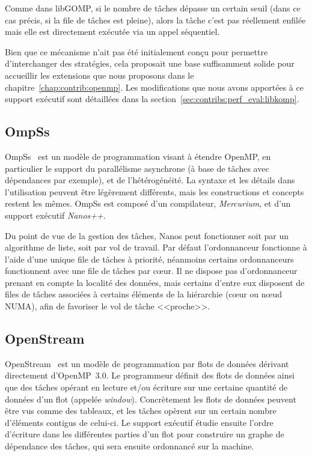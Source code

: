 Comme dans libGOMP, si le nombre de tâches dépasse un certain seuil (dans ce cas précis, si la file de tâches est pleine), alors la tâche c'est pas réellement enfilée mais elle est directement exécutée via un appel séquentiel.

Bien que ce mécanisme n'ait pas été initialement conçu pour permettre d'interchanger des stratégies, cela proposait une base suffisamment solide pour accueillir les extensions que nous proposons dans le chapitre~\ref{chap:contrib:openmp}.
Les modifications que nous avons apportées à ce support exécutif sont détaillées dans la section~\ref{sec:contribs:perf_eval:libkomp}.




\subsection{OmpSs}\label{subsec:rw:ompss}

OmpSs~\cite{OMPSs} est un modèle de programmation visant à étendre OpenMP, en particulier le support du parallélisme asynchrone (à base de tâches avec dépendances par exemple), et de l'hétérogénéité.
La syntaxe et les détails dans l'utilisation peuvent être légèrement différents, mais les constructions et concepts restent les mêmes.
OmpSs est composé d'un compilateur, \emph{Mercurium}, et d'un support exécutif \emph{Nanos++}.

Du point de vue de la gestion des tâches, Nanos peut fonctionner soit par un algorithme de liste, soit par vol de travail.
Par défaut l'ordonnanceur fonctionne à l'aide d'une unique file de tâches à priorité, néanmoins certains ordonnanceurs fonctionnent avec une file de tâches par cœur.
Il ne dispose pas d'ordonnanceur prenant en compte la localité des données, mais certains d'entre eux disposent de files de tâches associées à certains éléments de la hiérarchie (cœur ou nœud NUMA), afin de favoriser le vol de tâche <<proche>>.


\subsection{OpenStream}

OpenStream~\cite{Pop2013} est un modèle de programmation par flots de données dérivant directement d'OpenMP~3.0.
Le programmeur définit des flots de données ainsi que des tâches opérant en lecture et/ou écriture sur une certaine quantité de données d'un flot (appelée \emph{window}).
Concrètement les flots de données peuvent être vus comme des tableaux, et les tâches opèrent sur un certain nombre d'éléments contigus de celui-ci.
Le support exécutif étudie ensuite l'ordre d'écriture dans les différentes parties d'un flot pour construire un graphe de dépendance des tâches, qui sera ensuite ordonnancé sur la machine.

